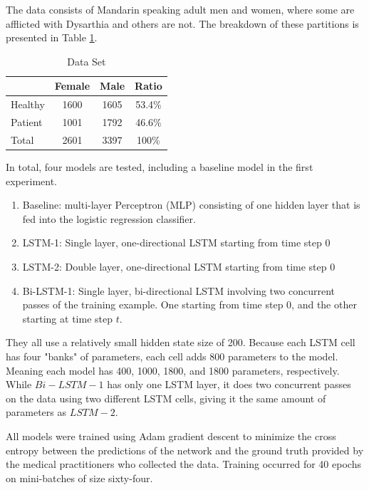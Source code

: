 \documentclass[conference]{IEEEtran}
\begin{document}
The data consists of Mandarin speaking adult men and women, where some are afflicted with Dysarthia and others are not. The breakdown of these partitions is presented in Table \ref{tab-data-partitions}.

\begin{table}[h]
\centering
\caption{Data Set}
\label{tab-data-partitions}
\begin{tabular}{|l|c|c|c|}
\hline
\multicolumn{1}{|c|}{}  & Female   &   Male    &    Ratio       \\ \hline
Healthy                 & 1600    &   1605     &    53.4\%      \\ \hline
Patient                 & 1001    &   1792     &    46.6\%      \\ \hline
Total                   & 2601    &   3397     &    100\%       \\ \hline
\end{tabular}
\end{table}

In total, four models are tested, including a baseline model in the first experiment.

\begin{enumerate}
    \item Baseline: multi-layer Perceptron (MLP) consisting of one hidden layer that is fed into the logistic regression classifier.
    \item LSTM-1: Single layer, one-directional LSTM starting from time step 0
    \item LSTM-2: Double layer, one-directional LSTM starting from time step 0
    \item Bi-LSTM-1: Single layer, bi-directional LSTM involving two concurrent passes of the training example. One starting from time step 0, and the other starting at time step $t$. 
\end{enumerate}

They all use a relatively small hidden state size of 200. Because each LSTM cell has four "banks" of parameters, each cell adds 800 parameters to the model. Meaning each model has 400, 1000, 1800, and 1800 parameters, respectively. While $Bi-LSTM-1$ has only one LSTM layer, it does two concurrent passes on the data using two different LSTM cells, giving it the same amount of parameters as $LSTM-2$. 

All models were trained using Adam gradient descent \cite{DBLP:journals/corr/KingmaB14} to minimize the cross entropy between the predictions of the network and the ground truth provided by the medical practitioners who collected the data. Training occurred for 40 epochs on mini-batches of size sixty-four. 
\end{document}
